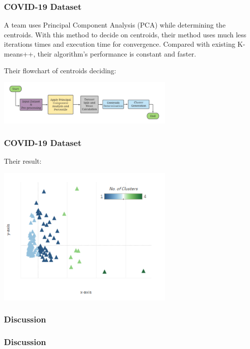 \documentclass[9pt]{beamer}
\begin{document}
\begin{frame}
	\frametitle{COVID-19 Dataset}
A team uses Principal Component Analysis (PCA)  while determining the centroids. With this method to decide on centroids, their method uses much less iterations times and execution time for convergence. Compared with existing K-means++, their algorithm's performance is constant and faster. \par
Their flowchart of centroids deciding:
\centerline{\includegraphics[width=0.65\textwidth]{figures/COVID19.png}}



\end{frame}


\begin{frame}
	\frametitle{COVID-19 Dataset}
Their result:
\centerline{\includegraphics[width=0.65\textwidth]{figures/covidResult.png}}
\end{frame}

\begin{frame}
	\frametitle{Discussion}

\end{frame}

\begin{frame}
	\frametitle{Discussion}

\end{frame}
\end{document}
